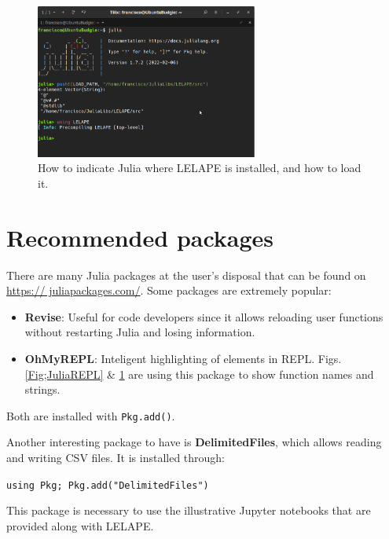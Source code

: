 \begin{figure}
	\centering

	\includegraphics[width=0.65\textwidth]{fig/Loading_LELAP.png}
	\caption{How to indicate Julia where LELAPE is installed, and how to load it.}
	\label{Fig:Loading_LELAPE}
\end{figure}

\section{Recommended packages}
%
There are many Julia packages at the user's disposal that can be found on \href{https://juliapackages.com/}{https:// juliapackages.com/}. Some packages are extremely popular:
\begin{itemize}
	\item \textbf{Revise}: Useful for code developers since it allows reloading user functions without restarting Julia and losing information.
	\item \textbf{OhMyREPL}: Inteligent highlighting of elements in REPL. Figs. \ref{Fig;JuliaREPL} \& \ref{Fig:Loading_LELAPE} are using this package to show function names and strings.
\end{itemize}

Both are installed with \texttt{Pkg.add()}. 


Another interesting package to have is \textbf{DelimitedFiles}, which allows reading and writing CSV files. It is installed through:
	
\vspace{1mm}
\begin{center}
	\texttt{using Pkg; Pkg.add("DelimitedFiles")}
\end{center}
\vspace{1mm}	

This package is necessary to use the illustrative Jupyter notebooks that are provided along with LELAPE.
